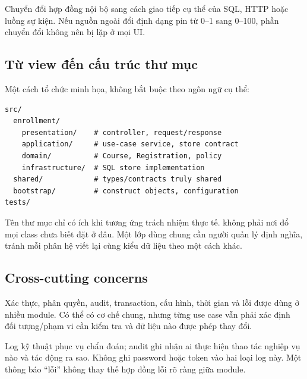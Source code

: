 Chuyển đổi hợp đồng nội bộ sang cách giao tiếp cụ thể của SQL, HTTP hoặc luồng sự kiện. Nếu nguồn ngoài đổi định dạng pin từ 0--1 sang 0--100, phần chuyển đổi không nên bị lặp ở mọi UI.

\subsection{Từ view đến cấu trúc thư mục}
Một cách tổ chức minh họa, không bắt buộc theo ngôn ngữ cụ thể:
\begin{Verbatim}
src/
  enrollment/
    presentation/    # controller, request/response
    application/     # use-case service, store contract
    domain/          # Course, Registration, policy
    infrastructure/  # SQL store implementation
  shared/            # types/contracts truly shared
  bootstrap/         # construct objects, configuration
tests/
\end{Verbatim}
Tên thư mục chỉ có ích khi tương ứng trách nhiệm thực tế.  không phải nơi đổ mọi class chưa biết đặt ở đâu. Một lớp dùng chung cần người quản lý định nghĩa, tránh mỗi phân hệ viết lại cùng kiểu dữ liệu theo một cách khác.

\subsection{Cross-cutting concerns}
Xác thực, phân quyền, audit, transaction, cấu hình, thời gian và lỗi được dùng ở nhiều module. Có thể có cơ chế chung, nhưng từng use case vẫn phải xác định đối tượng/phạm vi cần kiểm tra và dữ liệu nào được phép thay đổi.

Log kỹ thuật phục vụ chẩn đoán; audit ghi nhận ai thực hiện thao tác nghiệp vụ nào và tác động ra sao. Không ghi password hoặc token vào hai loại log này. Một thông báo ``lỗi'' không thay thế hợp đồng lỗi rõ ràng giữa module.
